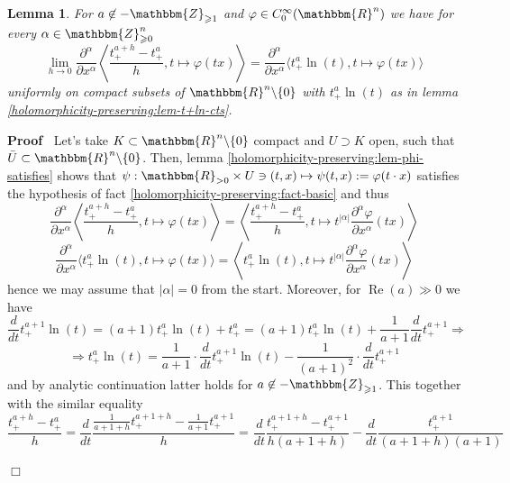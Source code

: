 \documentclass{article}
\newcommand{\assign}{:=}
\newcommand{\nin}{\not\in}
\newcommand{\tmop}[1]{\ensuremath{\operatorname{#1}}}
\newenvironment{proof}{\noindent\textbf{Proof\ }}{\hspace*{\fill}$\Box$\medskip}
\numberwithin{definition}{section}
\newtheorem{lemma}{Lemma}
\numberwithin{lemma}{section}
\numberwithin{proposition}{section}
{\theorembodyfont{\rmfamily}\newtheorem{remark}{Remark}
\numberwithin{remark}{section}
}
\begin{document}
\begin{lemma}
  \label{holomorphicity-preserving:lem-t+-smth-aux}For $a \nin
  -\mathbbm{Z}_{\geqslant 1}$ and $\varphi \in C_0^{\infty} ( \mathbbm{R}^n)$
  we have for every $\alpha \in \mathbbm{Z}_{\geqslant 0}^n$
  \[ \lim_{h \rightarrow 0} \frac{\partial^{\alpha}}{\partial x^{\alpha}}
     \left\langle \frac{t_+^{a + h} - t_+^a}{h}, t \mapsto \varphi ( t x)
     \right\rangle = \frac{\partial^{\alpha}}{\partial x^{\alpha}} \langle
     t_+^a \ln ( t), t \mapsto \varphi ( t x) \rangle \]
  uniformly on compact subsets of $\mathbbm{R}^n \backslash \{ 0 \}$ with
  $t_+^a \ln ( t)$ as in lemma \ref{holomorphicity-preserving:lem-t+ln-cts}.
\end{lemma}

\begin{proof}
  Let's take $K \subset \mathbbm{R}^n \backslash \{ 0 \}$ compact and $U
  \supset K$ open, such that $\bar{U} \subset \mathbbm{R}^n \backslash \{ 0
  \}$. Then, lemma \ref{holomorphicity-preserving:lem-phi-satisfies} shows
  that $\psi : \mathbbm{R}_{> 0} \times U \ni ( t, x) \mapsto \psi ( t, x)
  \assign \varphi ( t \cdot x)$ satisfies the hypothesis of fact
  \ref{holomorphicity-preserving:fact-basic} and thus
  \[ \frac{\partial^{\alpha}}{\partial x^{\alpha}} \left\langle \frac{t_+^{a +
     h} - t_+^a}{h}, t \mapsto \varphi ( t x) \right\rangle = \left\langle
     \frac{t_+^{a + h} - t_+^a}{h}, t \mapsto t^{| \alpha |}
     \frac{\partial^{\alpha} \varphi}{\partial x^{\alpha}} ( t x)
     \right\rangle \]
  \[ \frac{\partial^{\alpha}}{\partial x^{\alpha}} \langle t_+^a \ln ( t), t
     \mapsto \varphi ( t x) \rangle = \left\langle t_+^a \ln ( t), t \mapsto
     t^{| \alpha |} \frac{\partial^{\alpha} \varphi}{\partial x^{\alpha}} ( t
     x) \right\rangle \]
  hence we may assume that $| \alpha | = 0$ from the start. Moreover, for
  $\tmop{Re} ( a) \gg 0$ we have
  \[ \frac{d}{d t} t_+^{a + 1} \ln ( t) = ( a + 1) t_+^a \ln ( t) + t_+^a = (
     a + 1) t_+^a \ln ( t) + \frac{1}{a + 1} \frac{d}{d t} t_+^{a + 1}
     \Rightarrow \]
  \[ \Rightarrow t_+^a \ln ( t) = \frac{1}{a + 1} \cdot \frac{d}{d t} t_+^{a +
     1} \ln ( t) - \frac{1}{( a + 1)^2} \cdot \frac{d}{d t} t^{a + 1}_+ \]
  and by analytic continuation latter holds for $a \nin
  -\mathbbm{Z}_{\geqslant 1}$. This together with the similar equality
  \[ \frac{t_+^{a + h} - t_+^a}{h} = \frac{d}{d t} \frac{\frac{1}{a + 1 + h}
     t_+^{a + 1 + h} - \frac{1}{a + 1} t_+^{a + 1}}{h} =^{} \frac{d}{d t}
     \frac{t_+^{a + 1 + h} - t_+^{a + 1}}{h ( a + 1 + h)} - \frac{d}{d t}
     \frac{t_+^{a + 1}}{( a + 1 + h) ( a + 1)} \]

\end{proof}
\end{document}
